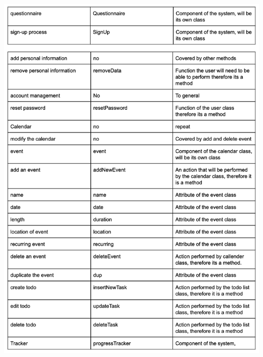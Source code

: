 \documentclass[a4paper,11pt]{article} %
\begin{document}
\begin{center}
    \includegraphics[scale=0.9]{img/noun-verb/page3.png}

\end{center}
\end{document}
